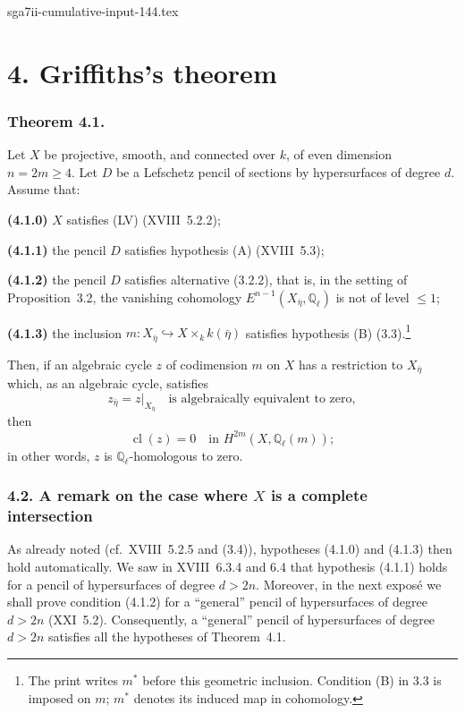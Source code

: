 \begin{filecontents*}{sga7ii-cumulative-input-144.tex}
\section*{4. Griffiths's theorem}

\subsubsection*{Theorem 4.1.}
Let $X$ be projective, smooth, and connected over $k$, of even dimension
$n=2m\geq4$.  Let $D$ be a Lefschetz pencil of sections by hypersurfaces
of degree $d$.  Assume that:

\medskip
\noindent\textbf{(4.1.0)} $X$ satisfies (LV) (XVIII~5.2.2);

\noindent\textbf{(4.1.1)} the pencil $D$ satisfies hypothesis (A)
(XVIII~5.3);

\noindent\textbf{(4.1.2)} the pencil $D$ satisfies alternative (3.2.2),
that is, in the setting of Proposition~3.2, the vanishing cohomology
$E^{n-1}(X_{\bar\eta},\mathbb Q_\ell)$ is not of level $\leq1$;

\noindent\textbf{(4.1.3)} the inclusion
$m:X_{\bar\eta}\hookrightarrow X\times_k k(\bar\eta)$ satisfies
hypothesis (B) (3.3).\footnote{The print writes $m^*$ before this geometric
inclusion.  Condition (B) in 3.3 is imposed on $m$; $m^*$ denotes its
induced map in cohomology.}

\medskip
Then, if an algebraic cycle $z$ of codimension $m$ on $X$ has a
restriction to $X_{\bar\eta}$ which, as an algebraic cycle, satisfies
\begin{equation}\tag{4.1.4}
z_{\bar\eta}=z|_{X_{\bar\eta}}
\quad\text{is algebraically equivalent to zero},
\end{equation}
then
\begin{equation}\tag{4.1.5}
\operatorname{cl}(z)=0
\quad\text{in }H^{2m}(X,\mathbb Q_\ell(m));
\end{equation}
in other words, $z$ is $\mathbb Q_\ell$-homologous to zero.

\subsubsection*{4.2. A remark on the case where $X$ is a complete intersection}
As already noted (cf.~XVIII~5.2.5 and (3.4)), hypotheses (4.1.0) and
(4.1.3) then hold automatically.  We saw in XVIII~6.3.4 and 6.4 that
hypothesis (4.1.1) holds for a pencil of hypersurfaces of degree $d>2n$.
Moreover, in the next exposé we shall prove condition (4.1.2) for a
``general'' pencil of hypersurfaces of degree $d>2n$ (XXI~5.2).
Consequently, a ``general'' pencil of hypersurfaces of degree $d>2n$
satisfies all the hypotheses of Theorem~4.1.


\end{filecontents*}
